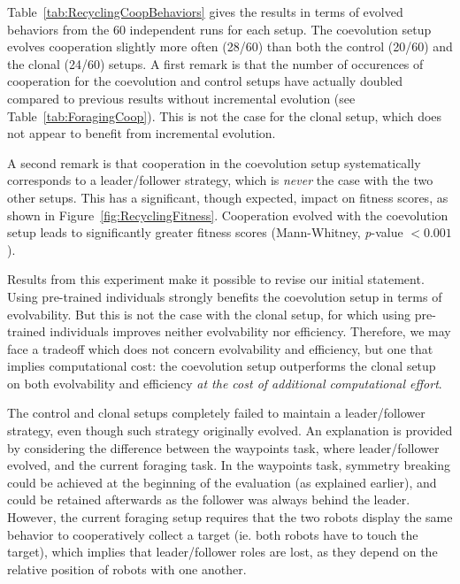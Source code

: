   Table~\ref{tab:RecyclingCoopBehaviors} gives the results in terms of evolved behaviors from the $60$ independent runs for each setup. 
  The coevolution setup evolves cooperation slightly more often (28/60) than both the control (20/60) and the clonal (24/60) setups. 
  A first remark is that the number of occurences of cooperation for the coevolution and control setups have actually doubled compared to previous results without incremental evolution (see Table~\ref{tab:ForagingCoop}). This is not the case for the clonal setup, which does not appear to benefit from incremental evolution. 

  A second remark is that cooperation in the coevolution setup systematically corresponds to a leader/follower strategy, which is \textit{never} the case with the two other setups. This has a significant, though expected, impact on fitness scores, as shown in Figure~\ref{fig:RecyclingFitness}. Cooperation evolved with the coevolution setup leads to significantly greater fitness scores (Mann-Whitney, {\em p}-value $<0.001$). 

  Results from this experiment make it possible to revise our initial statement. Using pre-trained individuals strongly benefits the coevolution setup in terms of evolvability. But this is not the case with the clonal setup, for which using pre-trained individuals improves neither evolvability nor efficiency. Therefore, we may face a tradeoff which does not concern evolvability and efficiency, but one that implies computational cost: the coevolution setup outperforms the clonal setup on both evolvability and efficiency \textit{at the cost of additional computational effort}.

  The control and clonal setups completely failed to maintain a leader/follower strategy, even though such strategy originally evolved. An explanation is provided by considering the difference between the waypoints task, where leader/follower evolved, and the current foraging task. In the waypoints task, symmetry breaking could be achieved at the beginning of the evaluation (as explained earlier), and could be retained afterwards as the follower was always behind the leader. However, the current foraging setup requires that the two robots display the same behavior to cooperatively collect a target (ie. both robots have to touch the target), which implies that leader/follower roles are lost, as they depend on the relative position of robots with one another. 


